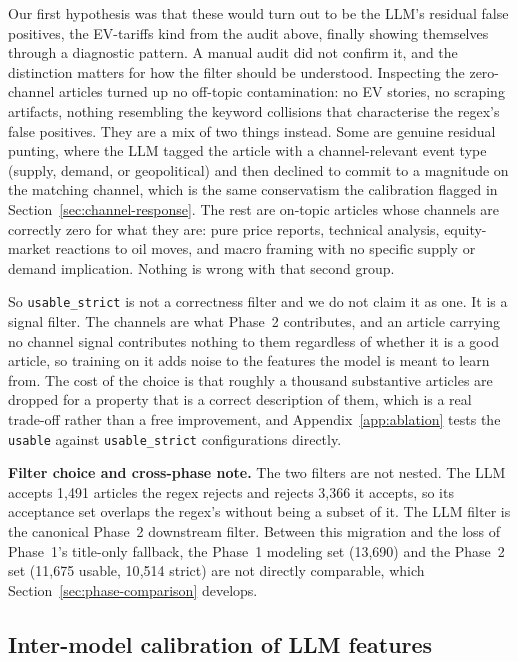 Our first hypothesis was that these would turn out to be the LLM's residual false positives, the EV-tariffs kind from the audit above, finally showing themselves through a diagnostic pattern. A manual audit did not confirm it, and the distinction matters for how the filter should be understood. Inspecting the zero-channel articles turned up no off-topic contamination: no EV stories, no scraping artifacts, nothing resembling the keyword collisions that characterise the regex's false positives. They are a mix of two things instead. Some are genuine residual punting, where the LLM tagged the article with a channel-relevant event type (supply, demand, or geopolitical) and then declined to commit to a magnitude on the matching channel, which is the same conservatism the calibration flagged in Section~\ref{sec:channel-response}. The rest are on-topic articles whose channels are correctly zero for what they are: pure price reports, technical analysis, equity-market reactions to oil moves, and macro framing with no specific supply or demand implication. Nothing is wrong with that second group.

So \texttt{usable\_strict} is not a correctness filter and we do not claim it as one. It is a signal filter. The channels are what Phase~2 contributes, and an article carrying no channel signal contributes nothing to them regardless of whether it is a good article, so training on it adds noise to the features the model is meant to learn from. The cost of the choice is that roughly a thousand substantive articles are dropped for a property that is a correct description of them, which is a real trade-off rather than a free improvement, and Appendix~\ref{app:ablation} tests the \texttt{usable} against \texttt{usable\_strict} configurations directly.

\textbf{Filter choice and cross-phase note.} The two filters are not nested. The LLM accepts 1{,}491 articles the regex rejects and rejects 3{,}366 it accepts, so its acceptance set overlaps the regex's without being a subset of it. The LLM filter is the canonical Phase~2 downstream filter. Between this migration and the loss of Phase~1's title-only fallback, the Phase~1 modeling set (13{,}690) and the Phase~2 set (11{,}675 usable, 10{,}514 strict) are not directly comparable, which Section~\ref{sec:phase-comparison} develops.

\subsection{Inter-model calibration of LLM features}\label{sec:calibration}

